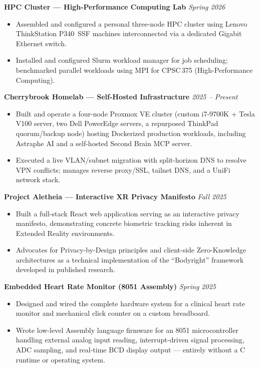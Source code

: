 \documentclass[10pt, letterpaper]{article}
\newcommand{\cvproject}[2]{\textbf{#1} \hfill \textit{#2}\vspace{1pt}}
\begin{document}
\vspace{4pt}

\cvproject{HPC Cluster --- High-Performance Computing Lab}{Spring 2026}
\begin{itemize}
  \item Assembled and configured a personal three-node HPC cluster using Lenovo ThinkStation
        P340~SSF machines interconnected via a dedicated Gigabit Ethernet switch.
  \item Installed and configured Slurm workload manager for job scheduling; benchmarked parallel
        workloads using MPI for CPSC\,375 (High-Performance Computing).
\end{itemize}

\vspace{4pt}

\cvproject{Cherrybrook Homelab --- Self-Hosted Infrastructure}{2025 -- Present}
\begin{itemize}
  \item Built and operate a four-node Proxmox VE cluster (custom i7-9700K + Tesla V100 server,
        two Dell PowerEdge servers, a repurposed ThinkPad quorum/backup node) hosting Dockerized
        production workloads, including Astraphe AI and a self-hosted Second Brain MCP server.
  \item Executed a live VLAN/subnet migration with split-horizon DNS to resolve VPN conflicts;
        manages reverse proxy/SSL, tailnet DNS, and a UniFi network stack.
\end{itemize}

\vspace{4pt}

\cvproject{Project Aletheia --- Interactive XR Privacy Manifesto}{Fall 2025}
\begin{itemize}
  \item Built a full-stack React web application serving as an interactive privacy manifesto,
        demonstrating concrete biometric tracking risks inherent in Extended Reality environments.
  \item Advocates for Privacy-by-Design principles and client-side Zero-Knowledge architectures
        as a technical implementation of the ``Bodyright'' framework developed in published
        research.
\end{itemize}

\vspace{4pt}

\cvproject{Embedded Heart Rate Monitor (8051 Assembly)}{Spring 2025}
\begin{itemize}
  \item Designed and wired the complete hardware system for a clinical heart rate monitor and
        mechanical click counter on a custom breadboard.
  \item Wrote low-level Assembly language firmware for an 8051 microcontroller handling external
        analog input reading, interrupt-driven signal processing, ADC sampling, and real-time BCD
        display output --- entirely without a C runtime or operating system.
\end{itemize}
\end{document}
